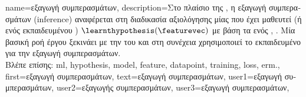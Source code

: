 {name={\foreignlanguage{greek}{εξαγωγή συμπερασμάτων}}, 
	description={\foreignlanguage{greek}{Στο πλαίσιο της} , \foreignlanguage{greek}{η εξαγωγή 
		συμπερασμάτων} (inference) 
		\foreignlanguage{greek}{αναφέρεται στη διαδικασία αξιολόγησης μίας} 
		 \foreignlanguage{greek}{που έχει μαθευτεί (ή ενός εκπαιδευμένου} 
		) $\learnthypothesis(\featurevec)$ \foreignlanguage{greek}{με βάση τα}
		 \foreignlanguage{greek}{ενός}  \cite{BishopBook}, \cite{Murphy2012}. 
		\foreignlanguage{greek}{Μία βασική ροή έργου}  \foreignlanguage{greek}{ξεκινάει με την} 
		 \foreignlanguage{greek}{του}  \foreignlanguage{greek}{και στη συνέχεια 
		χρησιμοποιεί το εκπαιδευμένο}  \foreignlanguage{greek}{για την εξαγωγή συμπερασμάτων}. 
				\\
		\foreignlanguage{greek}{Βλέπε επίσης:} \gls{ml}, \gls{hypothesis}, \gls{model}, \gls{feature}, \gls{datapoint}, 
		\gls{training}, \gls{loss}, \gls{erm}.},
	first={\foreignlanguage{greek}{εξαγωγή συμπερασμάτων}},
	text={\foreignlanguage{greek}{εξαγωγή συμπερασμάτων}},
	user1={\foreignlanguage{greek}{εξαγωγή συμπερασμάτων}}, %
	user2={\foreignlanguage{greek}{εξαγωγής συμπερασμάτων}}, %
	user3={\foreignlanguage{greek}{εξαγωγή συμπερασμάτων}}, %
}%

